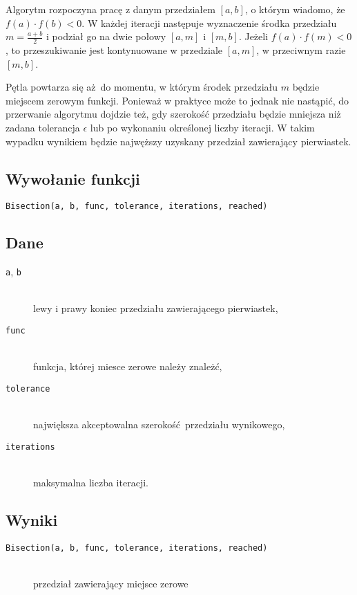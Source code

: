 \documentclass[12pt]{article}
\begin{document}
			Algorytm rozpoczyna pracę z danym przedziałem $[a, b]$,
			o którym wiadomo, że $f(a) \cdot f(b) < 0$.
			W każdej iteracji następuje wyznaczenie środka przedziału $m = \frac{a+b}{2}$
			i podział go na dwie połowy $[a, m]$ i $[m, b]$.
			Jeżeli $f(a) \cdot f(m) < 0$, to przeszukiwanie jest kontynuowane
			w przedziale $[a, m]$, w przeciwnym razie $[m, b]$.

			Pętla powtarza się aż do momentu, w którym środek przedziału $m$ będzie miejscem zerowym funkcji.
			Ponieważ w praktyce może to jednak nie nastąpić, do przerwanie algorytmu dojdzie też,
			gdy szerokość przedziału będzie mniejsza niż zadana tolerancja $\epsilon$
			lub po wykonaniu określonej liczby iteracji.
			W takim wypadku wynikiem będzie najwęższy uzyskany przedział zawierający pierwiastek.

		\subsection{Wywołanie funkcji}
			\texttt{Bisection(a, b, func, tolerance, iterations, reached)}

		\subsection{Dane}
			\begin{description}
				\item[\texttt{a}, \texttt{b}] \hfill\\ lewy i prawy koniec przedziału zawierającego pierwiastek,
				\item[\texttt{func}] \hfill\\ funkcja, której miesce zerowe należy znależć,
				\item[\texttt{tolerance}] \hfill\\ największa akceptowalna szerokość przedziału wynikowego,
				\item[\texttt{iterations}] \hfill\\ maksymalna liczba iteracji.
			\end{description}

		\subsection{Wyniki}
			\begin{description}
				\item[\texttt{Bisection(a, b, func, tolerance, iterations, reached)}] \hfill\\
					przedział zawierający miejsce zerowe
			\end{description}
\end{document}
